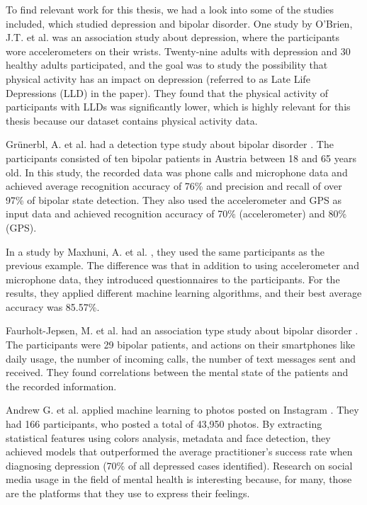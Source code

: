 To find relevant work for this thesis, we had a look into some of the studies included, which studied depression and bipolar disorder. One study by O'Brien, J.T. et al. \cite{obrien_depression} was an association study about depression, where the participants wore accelerometers on their wrists. Twenty-nine adults with depression and 30 healthy adults participated, and the goal was to study the possibility that physical activity has an impact on depression (referred to as Late Life Depressions (LLD) in the paper). They found that the physical activity of participants with LLDs was significantly lower, which is highly relevant for this thesis because our dataset contains physical activity data. 

Grünerbl, A. et al. had a detection type study about bipolar disorder \cite{grunerbl_smartphone_bipolar}. The participants consisted of ten bipolar patients in Austria between 18 and 65 years old. In this study, the recorded data was phone calls and microphone data and achieved average recognition accuracy of 76\% and precision and recall of over 97\% of bipolar state detection. They also used the accelerometer and GPS as input data and achieved recognition accuracy of 70\% (accelerometer) and 80\% (GPS).

In a study by Maxhuni, A. et al. \cite{maxhuni2016}, they used the same participants as the previous example. The difference was that in addition to using accelerometer and microphone data, they introduced questionnaires to the participants. For the results, they applied different machine learning algorithms, and their best average accuracy was 85.57\%.

Faurholt-Jepsen, M. et al. had an association type study about bipolar disorder \cite{faurholt_smartphone_bipolar}. The participants were 29 bipolar patients, and actions on their smartphones like daily usage, the number of incoming calls, the number of text messages sent and received. They found correlations between the mental state of the patients and the recorded information. 

Andrew G. et al. applied machine learning to photos posted on Instagram \cite{instagram_depression}. They had 166 participants, who posted a total of 43,950 photos. By extracting statistical features using colors analysis, metadata and face detection, they achieved models that outperformed the average practitioner's success rate when diagnosing depression (70\% of all depressed cases identified). Research on social media usage in the field of mental health is interesting because, for many, those are the platforms that they use to express their feelings. 

